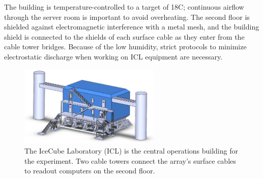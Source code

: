 The building is temperature-controlled to a target of 18C; continuous
airflow through the server room is important to avoid overheating.  The second
floor is shielded against electromagnetic interference with a metal
mesh, and the building shield is connected to the shields of each surface
cable as they enter from the cable tower bridges.  Because of the low
humidity, strict protocols to minimize electrostatic discharge when working
on ICL equipment are necessary.

\begin{figure}[!ht]
 \centering
 \includegraphics[width=0.6\textwidth]{graphics/intro/icl.png}
 \caption{The IceCube Laboratory (ICL) is the central operations building
   for the experiment.  Two cable towers connect the array's surface cables
   to readout computers on the second floor.}
 \label{fig:icl}
\end{figure}
